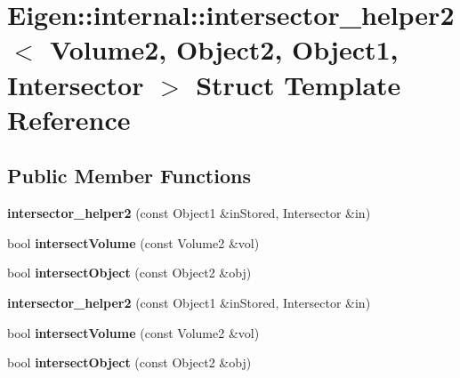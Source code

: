 \hypertarget{struct_eigen_1_1internal_1_1intersector__helper2}{}\section{Eigen\+:\+:internal\+:\+:intersector\+\_\+helper2$<$ Volume2, Object2, Object1, Intersector $>$ Struct Template Reference}
\label{struct_eigen_1_1internal_1_1intersector__helper2}
\subsection*{Public Member Functions}
\begin{DoxyCompactItemize}
\item 
\mbox{\label{struct_eigen_1_1internal_1_1intersector__helper2_a3162b917f819aa5bb8a8f61be134e368}} 
{\bfseries intersector\+\_\+helper2} (const Object1 \&in\+Stored, Intersector \&in)
\item 
\mbox{\label{struct_eigen_1_1internal_1_1intersector__helper2_ae8154579ad06723958fd19f7c16855e0}} 
bool {\bfseries intersect\+Volume} (const Volume2 \&vol)
\item 
\mbox{\label{struct_eigen_1_1internal_1_1intersector__helper2_a682ebd24a7a04f255d408c0e03edde9d}} 
bool {\bfseries intersect\+Object} (const Object2 \&obj)
\item 
\mbox{\label{struct_eigen_1_1internal_1_1intersector__helper2_a3162b917f819aa5bb8a8f61be134e368}} 
{\bfseries intersector\+\_\+helper2} (const Object1 \&in\+Stored, Intersector \&in)
\item 
\mbox{\label{struct_eigen_1_1internal_1_1intersector__helper2_ae8154579ad06723958fd19f7c16855e0}} 
bool {\bfseries intersect\+Volume} (const Volume2 \&vol)
\item 
\mbox{\label{struct_eigen_1_1internal_1_1intersector__helper2_a682ebd24a7a04f255d408c0e03edde9d}} 
bool {\bfseries intersect\+Object} (const Object2 \&obj)
\end{DoxyCompactItemize}
